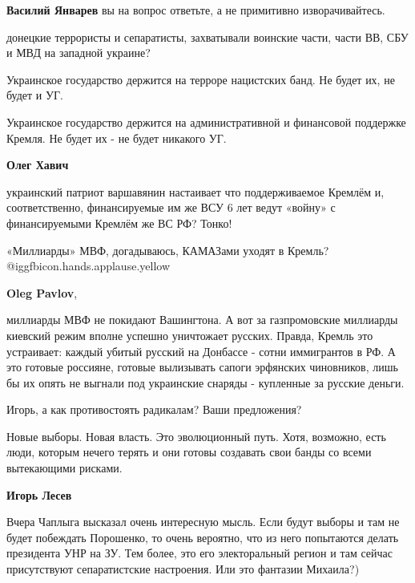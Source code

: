 \begin{itemize}
\begin{itemize}
\textbf{Василий Январев} вы на вопрос ответьте, а не примитивно изворачивайтесь.


донецкие террористы и сепаратисты, захватывали воинские части, части ВВ, СБУ и
МВД на западной украине?

\end{itemize} %

Украинское государство держится на терроре нацистских банд. Не будет их, не будет и УГ.

\begin{itemize} %

Украинское государство держится на административной и финансовой поддержке
Кремля. Не будет их - не будет никакого УГ.

\textbf{Олег Хавич} 

украинский патриот варшавянин настаивает что поддерживаемое Кремлём и,
соответственно, финансируемые им же ВСУ 6 лет ведут «войну» с финансируемыми
Кремлём же ВС РФ? Тонко!

«Миллиарды» МВФ, догадываюсь, КАМАЗами уходят в Кремль?  @igg{fbicon.hands.applause.yellow} 

\textbf{Oleg Pavlov}, 

миллиарды МВФ не покидают Вашингтона. А вот за газпромовские миллиарды киевский
режим вполне успешно уничтожает русских. Правда, Кремль это устраивает: каждый
убитый русский на Донбассе - сотни иммигрантов в РФ. А это готовые россияне,
готовые вылизывать сапоги эрфянских чиновников, лишь бы их опять не выгнали под
украинские снаряды - купленные за русские деньги.

\end{itemize} %


Игорь, а как противостоять радикалам? Ваши предложения?

\begin{itemize} %

Новые выборы. Новая власть. Это эволюционный путь. Хотя, возможно, есть люди,
которым нечего терять и они готовы создавать свои банды со всеми вытекающими
рисками.

\textbf{Игорь Лесев} 

Вчера Чаплыга высказал очень интересную мысль. Если будут выборы и там не будет
побеждать Порошенко, то очень вероятно, что из него попытаются делать президента
УНР на ЗУ. Тем более, это его электоральный регион и там сейчас присутствуют
сепаратистские настроения. Или это фантазии Михаила?)



\end{itemize}
\end{itemize}

